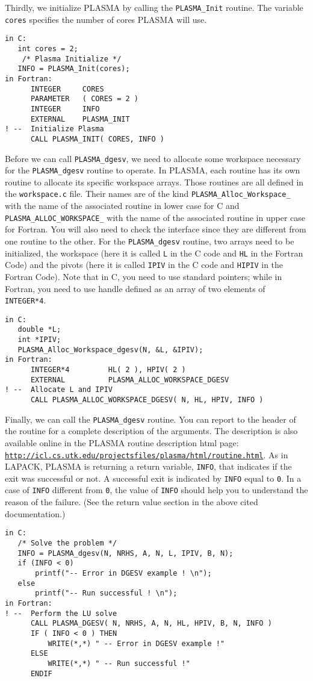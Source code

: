 Thirdly, we initialize PLASMA by calling the \texttt{PLASMA\_Init} routine.
The variable \texttt{cores} specifies the number of cores PLASMA will use.
\begin{verbatim}
in C:
   int cores = 2;
    /* Plasma Initialize */
   INFO = PLASMA_Init(cores);
in Fortran:
      INTEGER     CORES
      PARAMETER   ( CORES = 2 )
      INTEGER     INFO
      EXTERNAL    PLASMA_INIT
! --  Initialize Plasma
      CALL PLASMA_INIT( CORES, INFO )
\end{verbatim}

Before we can call \texttt{PLASMA\_dgesv}, we need to allocate some workspace
necessary for the \texttt{PLASMA\_dgesv} routine to operate.
In PLASMA, each routine has its own routine to allocate its specific workspace arrays. Those
routines are all defined in the \texttt{workspace.c} file. Their names are of
the kind \texttt{PLASMA\_Alloc\_Workspace\_} with the name of the associated
routine in lower case for C and \texttt{PLASMA\_ALLOC\_WORKSPACE\_} with the
name of the associated routine in upper case for Fortran. You will also need to
check the interface since they are different from one routine to the other.
For the \texttt{PLASMA\_dgesv} routine, two arrays need to be initialized,
the workspace (here it is called \texttt{L} in the C code and \texttt{HL} in
the Fortran Code) and the pivots (here it is called \texttt{IPIV} in the C code
and \texttt{HIPIV} in the Fortran Code). Note that in C, you need to use
standard pointers; while in Fortran, you need to use handle defined as an array
of two elements of \texttt{INTEGER*4}.
\begin{verbatim}
in C:
   double *L;
   int *IPIV;
   PLASMA_Alloc_Workspace_dgesv(N, &L, &IPIV);
in Fortran:
      INTEGER*4         HL( 2 ), HPIV( 2 )
      EXTERNAL          PLASMA_ALLOC_WORKSPACE_DGESV
! --  Allocate L and IPIV
      CALL PLASMA_ALLOC_WORKSPACE_DGESV( N, HL, HPIV, INFO )
\end{verbatim}

Finally, 
 we can call the
\texttt{PLASMA\_dgesv} routine. You can report to
the header of the routine for a complete description of the arguments. The
description is also available online in the PLASMA routine description html
page:
\texttt{\url{http://icl.cs.utk.edu/projectsfiles/plasma/html/routine.html}}. As
in LAPACK, PLASMA is returning a return variable, \texttt{INFO}, that indicates if the
exit was successful or not. A successful exit is indicated by \texttt{INFO} equal to \texttt{0}.
In a case of \texttt{INFO} different from \texttt{0}, the value of
\texttt{INFO} should help you to understand the reason of the failure. (See the return
value section in the above cited documentation.)
\begin{verbatim}
in C:
   /* Solve the problem */
   INFO = PLASMA_dgesv(N, NRHS, A, N, L, IPIV, B, N);
   if (INFO < 0)
       printf("-- Error in DGESV example ! \n");
   else
       printf("-- Run successful ! \n");
in Fortran:
! --  Perform the LU solve
      CALL PLASMA_DGESV( N, NRHS, A, N, HL, HPIV, B, N, INFO )
      IF ( INFO < 0 ) THEN
          WRITE(*,*) " -- Error in DGESV example !"
      ELSE
          WRITE(*,*) " -- Run successful !"
      ENDIF

\end{verbatim}


